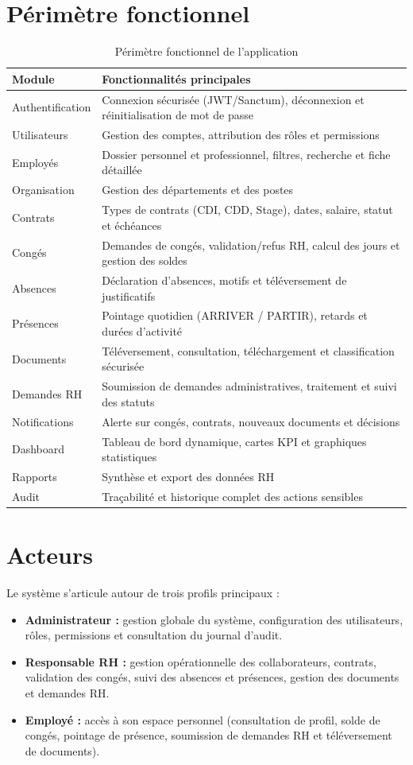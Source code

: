 \documentclass[12pt,a4paper]{report}
\begin{document}
\section{Périmètre fonctionnel}
\begin{table}[H]
\centering
\caption{Périmètre fonctionnel de l'application}
\label{tab:perimetre}
\begin{tabularx}{\textwidth}{l X}
\toprule
\textbf{Module} & \textbf{Fonctionnalités principales} \\
\midrule
Authentification & Connexion sécurisée (JWT/Sanctum), déconnexion et réinitialisation de mot de passe \\
Utilisateurs & Gestion des comptes, attribution des rôles et permissions \\
Employés & Dossier personnel et professionnel, filtres, recherche et fiche détaillée \\
Organisation & Gestion des départements et des postes \\
Contrats & Types de contrats (CDI, CDD, Stage), dates, salaire, statut et échéances \\
Congés & Demandes de congés, validation/refus RH, calcul des jours et gestion des soldes \\
Absences & Déclaration d'absences, motifs et téléversement de justificatifs \\
Présences & Pointage quotidien (ARRIVER / PARTIR), retards et durées d'activité \\
Documents & Téléversement, consultation, téléchargement et classification sécurisée \\
Demandes RH & Soumission de demandes administratives, traitement et suivi des statuts \\
Notifications & Alerte sur congés, contrats, nouveaux documents et décisions \\
Dashboard & Tableau de bord dynamique, cartes KPI et graphiques statistiques \\
Rapports & Synthèse et export des données RH \\
Audit & Traçabilité et historique complet des actions sensibles \\
\bottomrule
\end{tabularx}
\end{table}

\section{Acteurs}
Le système s'articule autour de trois profils principaux :
\begin{itemize}
    \item \textbf{Administrateur :} gestion globale du système, configuration des utilisateurs, rôles, permissions et consultation du journal d'audit.
    \item \textbf{Responsable RH :} gestion opérationnelle des collaborateurs, contrats, validation des congés, suivi des absences et présences, gestion des documents et demandes RH.
    \item \textbf{Employé :} accès à son espace personnel (consultation de profil, solde de congés, pointage de présence, soumission de demandes RH et téléversement de documents).
\end{itemize}
\end{document}
